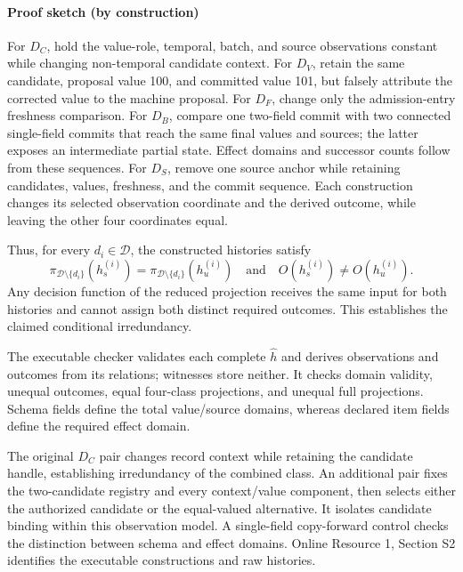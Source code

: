 \paragraph{Proof sketch (by construction)}
For $D_C$, hold the value-role, temporal, batch, and source observations constant while changing non-temporal candidate context. For $D_V$, retain the same candidate, proposal value 100, and committed value 101, but falsely attribute the corrected value to the machine proposal. For $D_F$, change only the admission-entry freshness comparison. For $D_B$, compare one two-field commit with two connected single-field commits that reach the same final values and sources; the latter exposes an intermediate partial state. Effect domains and successor counts follow from these sequences. For $D_S$, remove one source anchor while retaining candidates, values, freshness, and the commit sequence. Each construction changes its selected observation coordinate and the derived outcome, while leaving the other four coordinates equal.

Thus, for every $d_i\in\mathcal D$, the constructed histories satisfy
\begin{equation}
\pi_{\mathcal D\setminus\{d_i\}}(h_s^{(i)})
=
\pi_{\mathcal D\setminus\{d_i\}}(h_u^{(i)})
\quad\text{and}\quad
O(h_s^{(i)})\neq O(h_u^{(i)}).
\label{eq:irredundancy}
\end{equation}
Any decision function of the reduced projection receives the same input for both histories and cannot assign both distinct required outcomes. This establishes the claimed conditional irredundancy.

The executable checker validates each complete $\widehat h$ and derives observations and outcomes from its relations; witnesses store neither. It checks domain validity, unequal outcomes, equal four-class projections, and unequal full projections. Schema fields define the total value/source domains, whereas declared item fields define the required effect domain.

The original $D_C$ pair changes record context while retaining the candidate handle, establishing irredundancy of the combined class. An additional pair fixes the two-candidate registry and every context/value component, then selects either the authorized candidate or the equal-valued alternative. It isolates candidate binding within this observation model. A single-field copy-forward control checks the distinction between schema and effect domains. Online Resource 1, Section S2 identifies the executable constructions and raw histories.

